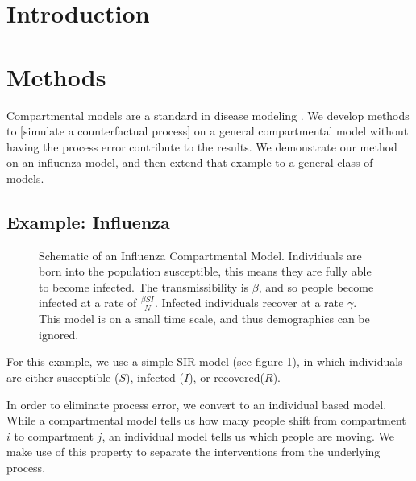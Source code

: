 \documentclass{article}
\begin{document}
\section{Introduction}
\section{Methods}
Compartmental models are a standard in disease modeling \cite{}.%
We develop methods to [simulate a counterfactual process] %
on a general compartmental model without having the process error contribute to the results.  We demonstrate our method on an influenza model, and then extend that example to a general class of models.


\subsection*{Example: Influenza}

\begin{figure}
\label{fig:sir}
\begin{center}
\end{center}
\caption{Schematic of an Influenza Compartmental Model. Individuals are born into the population susceptible, this means they are fully able to become infected.  The transmissibility is $\beta$, and so people become infected at a rate of $\frac{\beta SI}{N}$.  Infected individuals recover at a rate $\gamma$.  This model is on a small time scale, and thus demographics can be ignored.}
\end{figure}

For this example, we use a simple SIR model (see figure \ref{fig:sir}), in which individuals are either susceptible ($S$), infected ($I$), or recovered($R$).

In order to eliminate process error, we convert to an individual based model.  While a compartmental model tells us how many people shift from compartment $i$ to compartment $j$, an individual model tells us which people are moving.  We make use of this property to separate the interventions from the underlying process.
\end{document}
